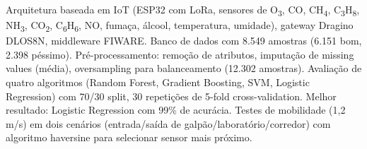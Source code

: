 \documentclass[12pt,a4paper]{article}
\begin{document}
                                     {Arquitetura baseada em IoT (ESP32 com 
                                      LoRa, sensores de O\textsubscript{3}, CO, CH\textsubscript{4}, C\textsubscript{3}H\textsubscript{8}, NH\textsubscript{3}, CO\textsubscript{2}, C\textsubscript{6}H\textsubscript{6}, 
                                      NO, fumaça, álcool, temperatura, umidade), gateway 
                                      Dragino DLOS8N, middleware FIWARE. Banco de dados com 
                                      8.549 amostras (6.151 bom, 2.398 péssimo). 
                                      Pré-processamento: remoção de atributos, 
                                      imputação de missing values (média), 
                                      oversampling para balanceamento (12.302 amostras). 
                                      Avaliação de quatro algoritmos 
                                      (Random Forest, Gradient Boosting, SVM, Logistic Regression) 
                                      com 70/30 split, 30 repetições de 5-fold cross-validation. 
                                      Melhor resultado: Logistic Regression com 99\% de acurácia. 
                                      Testes de mobilidade (1,2 m/s) em dois cenários (entrada/saída de galpão/laboratório/corredor) 
                                      com algoritmo haversine para selecionar sensor mais próximo.}
\end{document}
